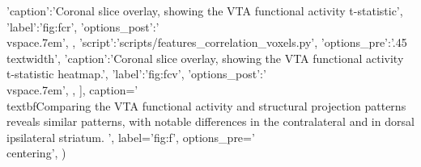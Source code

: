 \begin{sansmath}
{{                        'caption':'Coronal slice overlay, showing the VTA functional activity t-statistic',
                        'label':'fig:fcr',
                        'options_post':'\\vspace{.7em}',
                        },
                {'script':'scripts/features_correlation_voxels.py', 'options_pre':'{.45\\textwidth}',
                        'caption':'Coronal slice overlay, showing the VTA functional activity t-statistic heatmap.',
                        'label':'fig:fcv',
                        'options_post':'\\vspace{.7em}',
                        },
                ],
        caption='
                \\textbf{Comparing the VTA functional activity and structural projection patterns reveals similar patterns, with notable differences in the contralateral and in dorsal ipsilateral striatum.}
                ',
        label='fig:f',
        options_pre='\\centering',
        )}
\end{sansmath}
